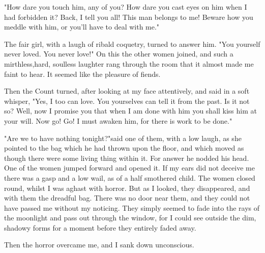 "How dare you touch him, any of you? How dare you cast eyes on him when I had forbidden it? Back, I tell you all! This man belongs to me! Beware how you meddle with him, or you'll have to deal with me." 

The fair girl, with a laugh of ribald coquetry, turned to answer him. "You yourself never loved. You never love!" On this the other women joined, and such a mirthless,hard, soulless laughter rang through the room that it almost made me faint to hear. It seemed like the pleasure of fiends. 

Then the Count turned, after looking at my face attentively, and said in a soft whisper, "Yes, I too can love. You yourselves can tell it from the past. Is it not so? Well, now I promise you that when I am done with him you shall kiss him at your will. Now go! Go! I must awaken him, for there is work to be done." 

"Are we to have nothing tonight?"said one of them, with a low laugh, as she pointed to the bag which he had thrown upon the floor, and which moved as though there were some living thing within it. For answer he nodded his head. One of the women jumped forward and opened it. If my ears did not deceive me there was a gasp and a low wail, as of a half smothered child. The women closed round, whilst I was aghast with horror. But as I looked, they disappeared, and with them the dreadful bag. There was no door near them, and they could not have passed me without my noticing. They simply seemed to fade into the rays of the moonlight and pass out through the window, for I could see outside the dim, shadowy forms for a moment before they entirely faded away. 

Then the horror overcame me, and I sank down unconscious. 
